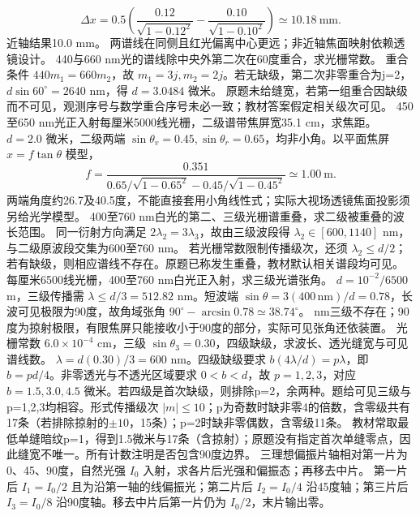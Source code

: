 \[
\Delta x=0.5\left(\frac{0.12}{\sqrt{1-0.12^2}}-\frac{0.10}{\sqrt{1-0.10^2}}\right)\simeq10.18\ \mathrm{mm}.
\]
近轴结果10.0 mm。
\crosscheck 两谱线在同侧且红光偏离中心更远；非近轴焦面映射依赖透镜设计。
\problemtext 440与660 nm光的谱线除中央外第二次在60度重合，求光栅常数。
\workings 重合条件 $440m_1=660m_2$，故 $m_1=3j,m_2=2j$。若无缺级，第二次非零重合为j=2，$d\sin60^\circ=2640$ nm，得 $d=3.0484$ 微米。
\crosscheck 原题未给缝宽，若第一组重合因缺级而不可见，观测序号与数学重合序号未必一致；教材答案假定相关级次可见。
\problemtext 450至650 nm光正入射每厘米5000线光栅，二级谱带焦屏宽35.1 cm，求焦距。
\workings $d=2.0$ 微米，二级两端 $\sin\theta_v=0.45,\sin\theta_r=0.65$，均非小角。以平面焦屏 $x=f\tan\theta$ 模型，
\[
f=\frac{0.351}{0.65/\sqrt{1-0.65^2}-0.45/\sqrt{1-0.45^2}}\simeq1.00\ \mathrm m.
\]
\crosscheck 两端角度约26.7及40.5度，不能直接套用小角线性式；实际大视场透镜焦面投影须另给光学模型。
\problemtext 400至760 nm白光的第二、三级光栅谱重叠，求二级被重叠的波长范围。
\workings 同一衍射方向满足 $2\lambda_2=3\lambda_3$，故由三级波段得 $\lambda_2\in[600,1140]$ nm，与二级原波段交集为600至760 nm。
\crosscheck 若光栅常数限制传播级次，还须 $\lambda_2\le d/2$；若有缺级，则相应谱线不存在。原题已称发生重叠，教材默认相关谱段均可见。
\problemtext 每厘米6500线光栅，400至760 nm白光正入射，求三级光谱张角。
\workings $d=10^{-2}/6500$ m，三级传播需 $\lambda\le d/3=512.82$ nm。短波端 $\sin\theta=3(400\,\mathrm{nm})/d=0.78$，长波可见极限为90度，故角域张角 $90^\circ-\arcsin0.78\simeq38.74^\circ$。
 nm三级不存在；90度为掠射极限，有限焦屏只能接收小于90度的部分，实际可见张角还依装置。
\problemtext 光栅常数 $6.0\times10^{-4}$ cm，三级 $\sin\theta_3=0.30$，四级缺级，求波长、透光缝宽与可见谱线数。
\workings $\lambda=d(0.30)/3=600$ nm。四级缺级要求 $b(4\lambda/d)=p\lambda$，即 $b=pd/4$。非零透光与不透光区域要求 $0<b<d$，故 $p=1,2,3$，对应 $b=1.5,3.0,4.5$ 微米。若四级是首次缺级，则排除p=2，余两种。题给可见三级与p=1,2,3均相容。形式传播级次 $|m|\le10$；p为奇数时缺非零4的倍数，含零级共有17条（若排除掠射的$\pm10$，15条）；p=2时缺非零偶数，含零级11条。
\crosscheck 教材常取最低单缝暗纹p=1，得到1.5微米与17条（含掠射）；原题没有指定首次单缝零点，因此缝宽不唯一。所有计数注明是否包含90度边界。
\problemtext 三理想偏振片轴相对第一片为0、45、90度，自然光强 $I_0$ 入射，求各片后光强和偏振态；再移去中片。
\workings 第一片后 $I_1=I_0/2$ 且为沿第一轴的线偏振光；第二片后 $I_2=I_0/4$ 沿45度轴；第三片后 $I_3=I_0/8$ 沿90度轴。移去中片后第一片仍为 $I_0/2$，末片输出零。
